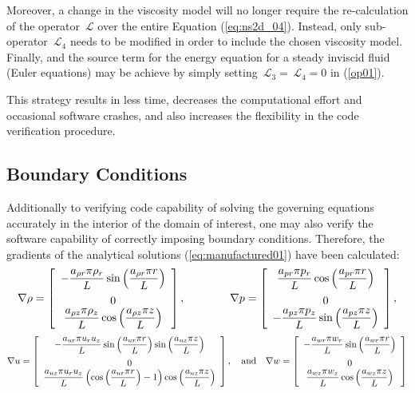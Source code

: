 \documentclass[10pt]{article}
\newcommand{\Lo}{\,\mathcal{L}}
\begin{document}
Moreover, a change in the viscosity model will no longer require the re-calculation of the operator $\Lo$ over the entire
Equation (\ref{eq:ns2d_04}). Instead, only sub-operator $\Lo_4$ needs to be modified in order to include the chosen viscosity model.
Finally, and the source term for the energy  equation for a steady inviscid fluid (Euler equations) may be achieve by simply setting $\Lo_3=\Lo_4=0$ in (\ref{op01}).

This strategy results in less time, decreases the computational effort and occasional software crashes, and also increases the flexibility in the code verification procedure.




\subsection{Boundary Conditions}
Additionally to verifying code capability of solving the governing equations accurately in the interior of the domain of interest, one may also verify the software capability of correctly imposing boundary conditions. Therefore, the gradients of the  analytical solutions (\ref{eq:manufactured01}) have been calculated:
\begin{equation*}
\nabla  \rho= \left[ \begin{array}{c}
-\dfrac{  a_{\rho r}  \pi \rho_r}{L} \sin\left( \dfrac{ a_{\rho r}  \pi  r}{L}\right)\vspace{5pt} \\
 0\\
 \dfrac{  a_{\rho z}  \pi \rho_z}{L}  \cos\left( \dfrac{ a_{\rho z}  \pi  z}{L}\right)
\end{array} \right],
\qquad\quad\quad
\nabla p = \left[ \begin{array}{c}
  \dfrac{  a_{pr}  \pi p_r}{L} \cos\left( \dfrac{ a_{pr}  \pi  r}{L}\right)\vspace{5pt}\\
  0\\
- \dfrac{  a_{pz}  \pi p_z}{L} \sin\left( \dfrac{ a_{pz}  \pi  z}{L}\right)
\end{array} \right],
\end{equation*}
\begin{equation*}
\nabla u = \left[ \begin{array}{c}
  -\dfrac{  a_{ur}  \pi u_r u_z}{L} \sin\left( \dfrac{ a_{ur}  \pi  r}{L}\right)\sin\left( \dfrac{ a_{uz}  \pi  z}{L}\right)\vspace{5pt}\\
  0\\
   \dfrac{  a_{uz}  \pi u_r u_z}{L} \left( \cos\left( \dfrac{ a_{ur}  \pi  r}{L}\right) -1\right)\cos\left( \dfrac{ a_{uz}  \pi  z}{L}\right)
\end{array} \right],
\quad\mbox{and}\quad
\nabla w = \left[ \begin{array}{c}
-\dfrac{  a_{wr}  \pi  w_r}{L} \sin\left( \dfrac{ a_{wr}  \pi  r}{L}\right)\vspace{5pt}\\
 0\\
  \dfrac{  a_{wz}  \pi w_z}{L}  \cos\left( \dfrac{ a_{wz}  \pi  z}{L}\right)
\end{array} \right]
\end{equation*}
\end{document}
